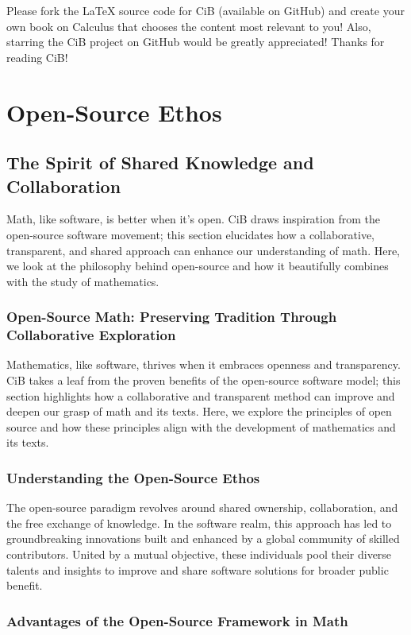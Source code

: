 \documentclass[a4paper,12pt]{book}
\begin{document}
\bigskip
\noindent
Please fork the \LaTeX{} source code for CiB (available on GitHub) and create your own book on Calculus that chooses the content most relevant to you! Also, starring the CiB project on GitHub would be greatly appreciated! Thanks for reading CiB!

\chapter{Open-Source Ethos}
\section*{The Spirit of Shared Knowledge and Collaboration}
Math, like software, is better when it's open. CiB draws inspiration from the open-source software movement; this section elucidates how a collaborative, transparent, and shared approach can enhance our understanding of math. Here, we look at the philosophy behind open-source and how it beautifully combines with the study of mathematics.

\subsection*{Open-Source Math: Preserving Tradition Through Collaborative Exploration}
Mathematics, like software, thrives when it embraces openness and transparency. CiB takes a leaf from the proven benefits of the open-source software model; this section highlights how a collaborative and transparent method can improve and deepen our grasp of math and its texts. Here, we explore the principles of open source and how these principles align with the development of mathematics and its texts.

\subsection*{Understanding the Open-Source Ethos}
The open-source paradigm revolves around shared ownership, collaboration, and the free exchange of knowledge. In the software realm, this approach has led to groundbreaking innovations built and enhanced by a global community of skilled contributors. United by a mutual objective, these individuals pool their diverse talents and insights to improve and share software solutions for broader public benefit.

\subsection*{Advantages of the Open-Source Framework in Math}
\end{document}
